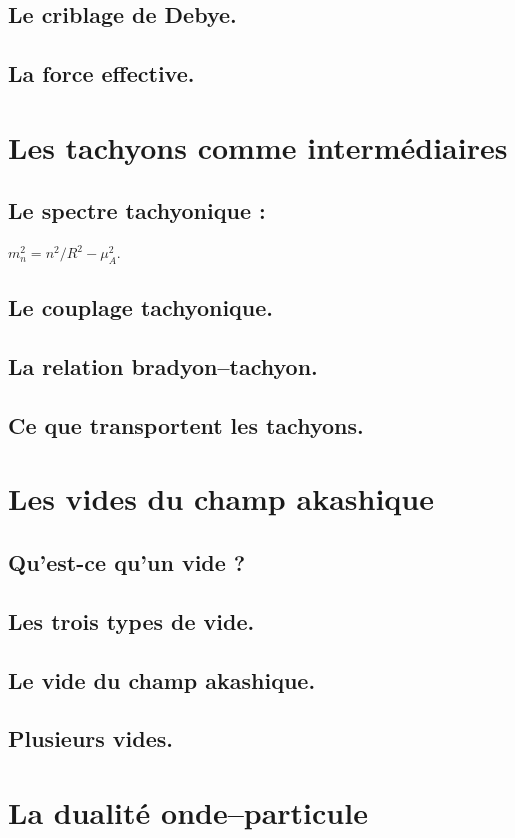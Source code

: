 \documentclass[11pt,a4paper]{article}
\begin{document}
\subsection{Le criblage de Debye.}
\subsection{La force effective.}

\section{Les tachyons comme intermédiaires}
\subsection{Le spectre tachyonique :} $m_n^2 = n^2/R^2 - \mu_A^2$.
\subsection{Le couplage tachyonique.}
\subsection{La relation bradyon--tachyon.}
\subsection{Ce que transportent les tachyons.}

\section{Les vides du champ akashique}
\subsection{Qu'est-ce qu'un vide ?}
\subsection{Les trois types de vide.}
\subsection{Le vide du champ akashique.}
\subsection{Plusieurs vides.}

\section{La dualité onde--particule}
\end{document}
